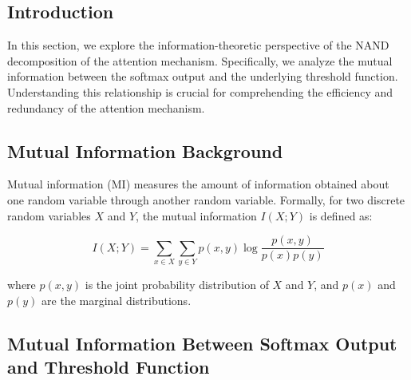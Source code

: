 \documentclass[11pt]{article}
\theoremstyle{definition}
\begin{document}
\subsection{Introduction}






In this section, we explore the information-theoretic perspective of the NAND decomposition of the attention mechanism. Specifically, we analyze the mutual information between the softmax output and the underlying threshold function. Understanding this relationship is crucial for comprehending the efficiency and redundancy of the attention mechanism.













\subsection{Mutual Information Background}






Mutual information (MI) measures the amount of information obtained about one random variable through another random variable. Formally, for two discrete random variables \(X\) and \(Y\), the mutual information \(I(X; Y)\) is defined as:






\[






I(X; Y) = \sum_{x \in X} \sum_{y \in Y} p(x, y) \log \frac{p(x, y)}{p(x)p(y)}






\]






where \(p(x, y)\) is the joint probability distribution of \(X\) and \(Y\), and \(p(x)\) and \(p(y)\) are the marginal distributions.













\subsection{Mutual Information Between Softmax Output and Threshold Function}
\end{document}
